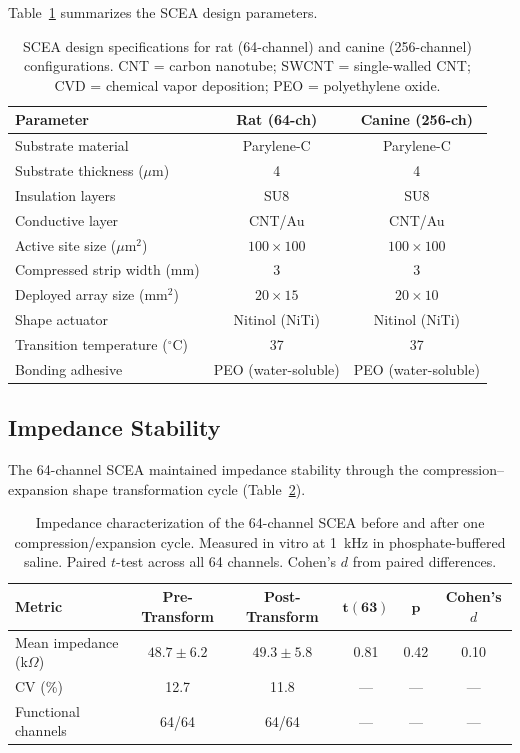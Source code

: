 \documentclass[11pt]{article}
\begin{document}
Table~\ref{tab:design} summarizes the SCEA design parameters.

\begin{table}[H]
\centering
\caption{SCEA design specifications for rat (64-channel) and canine (256-channel) configurations. CNT = carbon nanotube; SWCNT = single-walled CNT; CVD = chemical vapor deposition; PEO = polyethylene oxide.}
\label{tab:design}
\begin{tabular}{lcc}
\toprule
\textbf{Parameter} & \textbf{Rat (64-ch)} & \textbf{Canine (256-ch)} \\
\midrule
Substrate material & Parylene-C & Parylene-C \\
Substrate thickness ($\mu$m) & 4 & 4 \\
Insulation layers & SU8 & SU8 \\
Conductive layer & CNT/Au & CNT/Au \\
Active site size ($\mu$m$^2$) & $100 \times 100$ & $100 \times 100$ \\
Compressed strip width (mm) & 3 & 3 \\
Deployed array size (mm$^2$) & $20 \times 15$ & $20 \times 10$ \\
Shape actuator & Nitinol (NiTi) & Nitinol (NiTi) \\
Transition temperature ($^\circ$C) & 37 & 37 \\
Bonding adhesive & PEO (water-soluble) & PEO (water-soluble) \\
\bottomrule
\end{tabular}
\end{table}

\subsection{Impedance Stability}

The 64-channel SCEA maintained impedance stability through the compression--expansion shape transformation cycle (Table~\ref{tab:impedance}).

\begin{table}[H]
\centering
\caption{Impedance characterization of the 64-channel SCEA before and after one compression/expansion cycle. Measured in vitro at 1~kHz in phosphate-buffered saline. Paired $t$-test across all 64 channels. Cohen's $d$ from paired differences.}
\label{tab:impedance}
\begin{tabular}{lccccc}
\toprule
\textbf{Metric} & \textbf{Pre-Transform} & \textbf{Post-Transform} & $\boldsymbol{t(63)}$ & $\boldsymbol{p}$ & \textbf{Cohen's $d$} \\
\midrule
Mean impedance (k$\Omega$) & $48.7 \pm 6.2$ & $49.3 \pm 5.8$ & 0.81 & 0.42 & 0.10 \\
CV (\%) & 12.7 & 11.8 & --- & --- & --- \\
Functional channels & 64/64 & 64/64 & --- & --- & --- \\
\bottomrule
\end{tabular}
\end{table}
\end{document}
